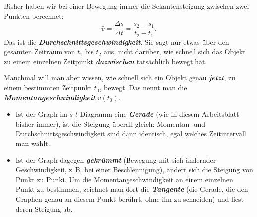 \begin{theoriebox}
Bisher haben wir bei einer Bewegung immer die Sekantensteigung zwischen
zwei Punkten berechnet:
\[
  \bar v = \frac{\Delta s}{\Delta t} = \frac{s_2-s_1}{t_2-t_1}.
\]
Das ist die \textbf{\emph{Durchschnittsgeschwindigkeit}}. Sie sagt nur etwas über
den gesamten Zeitraum von $t_1$ bis $t_2$ aus, nicht darüber, wie schnell
sich das Objekt zu einem einzelnen Zeitpunkt \textbf{\emph{dazwischen}} tatsächlich
bewegt hat.

Manchmal will man aber wissen, wie schnell sich ein Objekt genau
\textbf{\emph{jetzt}}, zu einem bestimmten Zeitpunkt $t_0$, bewegt. Das nennt man
die \textbf{\emph{Momentangeschwindigkeit}} $v(t_0)$.

\begin{itemize}[leftmargin=1.2cm,itemsep=0.4em]
  \item Ist der Graph im $s$-$t$-Diagramm eine \textbf{\emph{Gerade}} (wie in
  diesem Arbeitsblatt bisher immer), ist die Steigung überall gleich:
  Momentan- und Durchschnittsgeschwindigkeit sind dann identisch, egal
  welches Zeitintervall man wählt.
  \item Ist der Graph dagegen \textbf{\emph{gekrümmt}} (Bewegung mit sich
  ändernder Geschwindigkeit, z.\,B. bei einer Beschleunigung), ändert
  sich die Steigung von Punkt zu Punkt. Um die Momentangeschwindigkeit an
  einem einzelnen Punkt zu bestimmen, zeichnet man dort die
  \textbf{\emph{Tangente}} (die Gerade, die den Graphen genau an diesem Punkt
  berührt, ohne ihn zu schneiden) und liest deren Steigung ab.
\end{itemize}

\begin{center}
\end{center}


\end{theoriebox}
